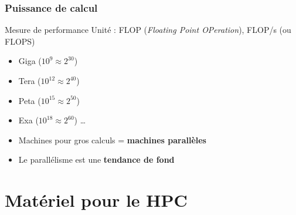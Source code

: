 \documentclass[xcolor={x11names,svgnames}]{beamer}
\newcommand{\red}{\alert}
\begin{document}

\begin{frame}
  \frametitle{Puissance de calcul}

  \begin{block}{Mesure de performance}
  Unité : FLOP (\textit{Floating Point OPeration}), FLOP/s (ou FLOPS)

  \begin{itemize}
  \item Giga ($10^9 \approx 2^{30}$)
  \item Tera ($10^{12} \approx 2^{40}$)
  \item Peta ($10^{15} \approx 2^{50}$)
  \item Exa  ($10^{18} \approx 2^{60}$) \dots 
  \end{itemize}
\end{block}

\bigskip

\begin{itemize}
\item Machines pour gros calculs = \textbf{machines \red{parallèles}}

  \medskip

  \item Le parallélisme est une \textbf{tendance de fond}
  \end{itemize}
\end{frame}


\section{Matériel pour le HPC}

\end{document}
